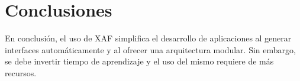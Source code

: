 \documentclass{article}
\begin{document}
\section{Conclusiones}

En conclusión, el uso de XAF simplifica el desarrollo de aplicaciones al generar interfaces automáticamente y al ofrecer una arquitectura modular. Sin embargo, se debe invertir tiempo de aprendizaje y el uso del mismo requiere de más recursos.     




\end{document}
